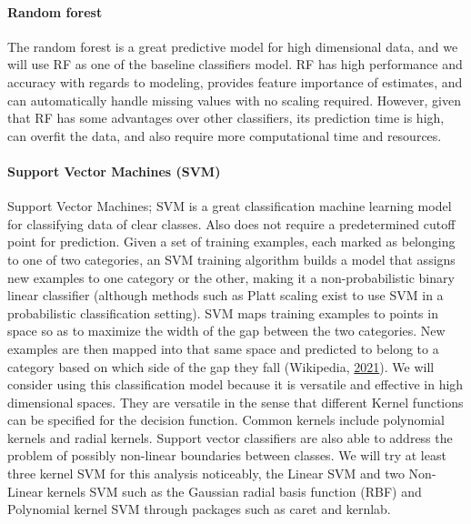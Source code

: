 \documentclass[
  10pt,
]{article}
\begin{document}
\paragraph{Random forest}

The random forest is a great predictive model for high dimensional data, and we will use RF as one of the baseline classifiers model. RF has high performance and accuracy with regards to modeling, provides feature importance of estimates, and can automatically handle missing values with no scaling required. However, given that RF has some advantages over other classifiers, its prediction time is high, can overfit the data, and also require more computational time and resources.

\hypertarget{support-vector-machines-svm}{%
\paragraph{\texorpdfstring{Support Vector Machines (SVM) }{Support Vector Machines (SVM)  }}\label{support-vector-machines-svm}}

Support Vector Machines; SVM is a great classification machine learning model for classifying data of clear classes. Also does not require a predetermined cutoff point for prediction. Given a set of training examples, each marked as belonging to one of two categories, an SVM training algorithm builds a model that assigns new examples to one category or the other, making it a non-probabilistic binary linear classifier (although methods such as Platt scaling exist to use SVM in a probabilistic classification setting). SVM maps training examples to points in space so as to maximize the width of the gap between the two categories. New examples are then mapped into that same space and predicted to belong to a category based on which side of the gap they fall (Wikipedia, \protect\hyperlink{ref-wikipedia}{2021}).
We will consider using this classification model because it is versatile and effective in high dimensional spaces. They are versatile in the sense that different Kernel functions can be specified for the decision function. Common kernels include polynomial kernels and radial kernels. Support vector classifiers are also able to address the problem of possibly non-linear boundaries between classes. We will try at least three kernel SVM for this analysis noticeably, the Linear SVM and two Non-Linear kernels SVM such as the Gaussian radial basis function (RBF) and Polynomial kernel SVM through packages such as caret and kernlab.
\end{document}
